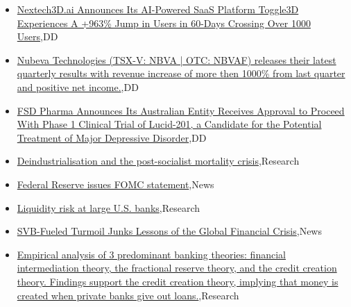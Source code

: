 \documentclass{article}%
\begin{document}
%
\begin{itemize}%
\item%
\href{https://reddit.com/r/Baystreetbets/comments/11zj5gt/nextech3dai\_announces\_its\_aipowered\_saas\_platform/}{Nextech3D.ai Announces Its AI-Powered SaaS Platform Toggle3D Experiences A +963\% Jump in Users in 60-Days Crossing Over 1000 Users},DD%
\item%
\href{https://reddit.com/r/Baystreetbets/comments/11ylbsr/nubeva\_technologies\_tsxv\_nbva\_otc\_nbvaf\_releases/}{Nubeva Technologies (TSX-V: NBVA | OTC: NBVAF) releases their latest quarterly results with revenue increase of more then 1000\% from last quarter and positive net income.},DD%
\item%
\href{https://reddit.com/r/Baystreetbets/comments/11yjk4o/fsd\_pharma\_announces\_its\_australian\_entity/}{FSD Pharma Announces Its Australian Entity Receives Approval to Proceed With Phase 1 Clinical Trial of Lucid-201, a Candidate for the Potential Treatment of Major Depressive Disorder},DD%
\item%
\href{https://reddit.com/r/Economics/comments/11ywyk3/deindustrialisation\_and\_the\_postsocialist/}{Deindustrialisation and the post-socialist mortality crisis},Research%
\item%
\href{https://reddit.com/r/Economics/comments/11yr21b/federal\_reserve\_issues\_fomc\_statement/}{Federal Reserve issues FOMC statement},News%
\item%
\href{https://reddit.com/r/Economics/comments/11ybkka/liquidity\_risk\_at\_large\_us\_banks/}{Liquidity risk at large U.S. banks},Research%
\item%
\href{https://reddit.com/r/Economics/comments/11xr2vm/svbfueled\_turmoil\_junks\_lessons\_of\_the\_global/}{SVB-Fueled Turmoil Junks Lessons of the Global Financial Crisis},News%
\item%
\href{https://reddit.com/r/Economics/comments/11xq6qt/empirical\_analysis\_of\_3\_predominant\_banking/}{Empirical analysis of 3 predominant banking theories: financial intermediation theory, the fractional reserve theory, and the credit creation theory. Findings support the credit creation theory, implying that money is created when private banks give out loans.},Research%
\end{itemize}%
\end{document}

